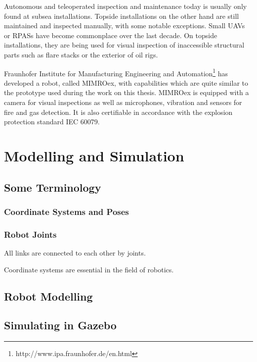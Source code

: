 Autonomous and teleoperated inspection and maintenance today is usually only found at subsea installations. Topside installations on the other hand are still maintained and inspected manually, with some notable exceptions. Small \acp{UAV} or \acp{RPAS} have become commonplace over the last decade. On topside installations, they are being used for visual inspection of inaccessible structural parts such as flare stacks or the exterior of oil rigs. 

Fraunhofer Institute for Manufacturing Engineering and Automation\footnote{http://www.ipa.fraunhofer.de/en.html} has developed a robot, called \ac{MIMROex}, with capabilities which are quite similar to the prototype used during the work on this thesis. \ac{MIMROex} is equipped with a camera for visual inspections as well as microphones, vibration and sensors for fire and gas detection. It is also certifiable in accordance with the explosion protection standard IEC 60079\cite{MIMROex}. 

\section{Modelling and Simulation}

\subsection{Some Terminology}

\subsubsection{Coordinate Systems and Poses}

\subsubsection{Robot Joints}

All links are connected to each other by joints. 

Coordinate systems are essential in the field of robotics. 

\subsection{Robot Modelling}

\subsection{Simulating in Gazebo}

